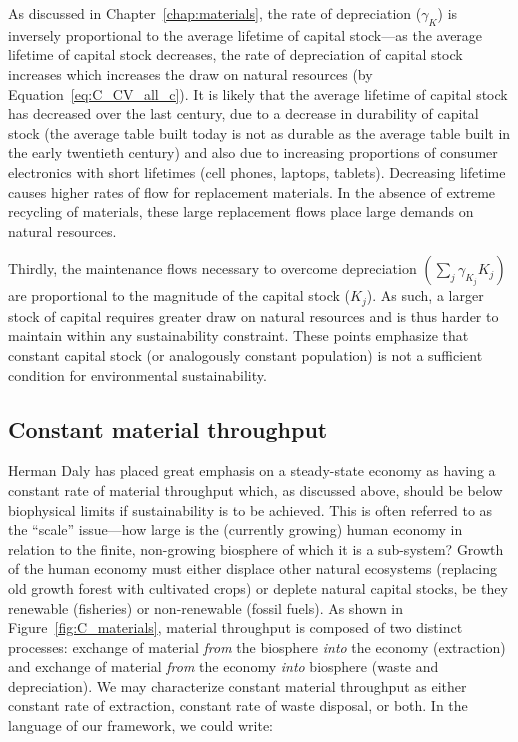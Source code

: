 As discussed in Chapter~\ref{chap:materials},
the rate of depreciation ($\gamma_{K}$) is inversely
proportional to the average lifetime of capital stock---as
the average lifetime of capital stock decreases,
the rate of depreciation of capital stock increases which
increases the draw on natural resources (by Equation~\ref{eq:C_CV_all_c}).
It is likely that the average lifetime of capital stock has
decreased over the last century, 
due to a decrease in durability of capital stock
(the average table built today is not as durable as the average table
built in the early twentieth century)
and also due to increasing proportions of consumer electronics
with short lifetimes (cell phones, laptops, tablets).
Decreasing lifetime causes higher rates of flow for
replacement materials.
In the absence of extreme recycling of materials,
these large replacement flows place large demands on
natural resources.

Thirdly,
the maintenance flows necessary to overcome
depreciation
$\left(\sum_{j}\gamma_{K_{j}}K_{j}\right)$
are proportional to the magnitude of the capital
stock ($K_{j}$).
As such,
a larger stock of capital requires
greater draw on natural resources and is thus harder
to maintain within any sustainability constraint.
These points emphasize that constant capital stock
(or analogously constant population)
is not a sufficient condition for environmental sustainability.


\subsection{Constant material throughput}

Herman Daly has placed great emphasis on a steady-state
economy as having a constant rate of material throughput 
\cite{Daly1977, Daly1997}
which, as discussed above, should be below biophysical limits
if sustainability is to be achieved.
This is often referred to as the ``scale'' issue---how 
large is the (currently growing) human economy in relation
to the finite, non-growing biosphere of which it is a sub-system?
Growth of the human economy must either displace other natural
ecosystems (replacing old growth forest with cultivated crops)
or deplete natural capital stocks, be they 
renewable (fisheries) or 
non-renewable (fossil fuels).
As shown in Figure~\ref{fig:C_materials},
material throughput is composed of two distinct processes:
exchange of material \emph{from} the biosphere 
\emph{into} the economy (extraction)
and exchange of material \emph{from} the economy
\emph{into} biosphere (waste and depreciation).
We may characterize constant material throughput
as either constant rate of extraction, constant rate of
waste disposal, or both.
In the language of our framework, we could write:

